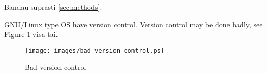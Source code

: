 Bandau suprasti \ref{sec:methods}.

GNU/Linux type OS have version control.
Version control may be done badly, see Figure \ref{fig:version-control} visa tai.

\begin{figure}
  \centering
  \texttt{[image: images/bad-version-control.ps]}
  \caption{Bad version control}
  \label{fig:version-control}
\end{figure}

